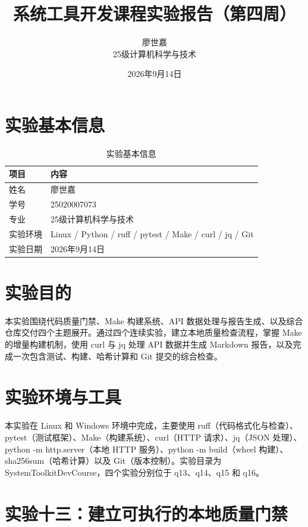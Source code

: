 \documentclass[UTF8]{ctexart}
\title{\textbf{系统工具开发课程实验报告（第四周）}}
\author{廖世嘉 \quad 25020007073 \\ 25级计算机科学与技术}
\date{2026年9月14日}
\begin{document}
\maketitle
\tableofcontents
\newpage

\section{实验基本信息}

\begin{table}[htbp]
\centering
\caption{实验基本信息}
\label{tab:info}
\begin{tabular}{ll}
\toprule
项目 & 内容 \\
\midrule
姓名 & 廖世嘉 \\
学号 & 25020007073 \\
专业 & 25级计算机科学与技术 \\
实验环境 & Linux / Python / ruff / pytest / Make / curl / jq / Git \\
实验日期 & 2026年9月14日 \\
\bottomrule
\end{tabular}
\end{table}

\section{实验目的}

本实验围绕代码质量门禁、Make 构建系统、API 数据处理与报告生成、以及综合仓库交付四个主题展开。通过四个连续实验，建立本地质量检查流程，掌握 Make 的增量构建机制，使用 curl 与 jq 处理 API 数据并生成 Markdown 报告，以及完成一次包含测试、构建、哈希计算和 Git 提交的综合检查。

\section{实验环境与工具}

本实验在 Linux 和 Windows 环境中完成，主要使用 ruff（代码格式化与检查）、pytest（测试框架）、Make（构建系统）、curl（HTTP 请求）、jq（JSON 处理）、python -m http.server（本地 HTTP 服务）、python -m build（wheel 构建）、sha256sum（哈希计算）以及 Git（版本控制）。实验目录为 SystemToolkitDevCourse，四个实验分别位于 q13、q14、q15 和 q16。

\section{实验十三：建立可执行的本地质量门禁}
\end{document}
